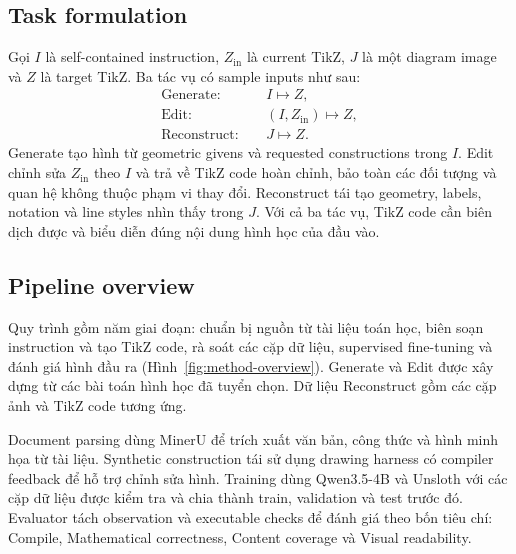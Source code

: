 \documentclass[a4paper,12pt]{article}
\begin{document}
\subsection{Task formulation}
\label{sec:tasks}
Gọi $I$ là self-contained instruction, $Z_{\mathrm{in}}$ là current TikZ, $J$ là một diagram image và $Z$ là target TikZ. Ba tác vụ có sample inputs như sau:
\begin{equation}
\begin{aligned}
\mathrm{Generate}:&\quad I\longmapsto Z,\\
\mathrm{Edit}:&\quad (I,Z_{\mathrm{in}})\longmapsto Z,\\
\mathrm{Reconstruct}:&\quad J\longmapsto Z.
\end{aligned}
\end{equation}
Generate tạo hình từ geometric givens và requested constructions trong $I$. Edit chỉnh sửa $Z_{\mathrm{in}}$ theo $I$ và trả về TikZ code hoàn chỉnh, bảo toàn các đối tượng và quan hệ không thuộc phạm vi thay đổi. Reconstruct tái tạo geometry, labels, notation và line styles nhìn thấy trong $J$. Với cả ba tác vụ, TikZ code cần biên dịch được và biểu diễn đúng nội dung hình học của đầu vào.

\subsection{Pipeline overview}
\label{sec:overview}
Quy trình gồm năm giai đoạn: chuẩn bị nguồn từ tài liệu toán học, biên soạn instruction và tạo TikZ code, rà soát các cặp dữ liệu, supervised fine-tuning và đánh giá hình đầu ra (Hình~\ref{fig:method-overview}). Generate và Edit được xây dựng từ các bài toán hình học đã tuyển chọn. Dữ liệu Reconstruct gồm các cặp ảnh và TikZ code tương ứng.

Document parsing dùng MinerU \cite{mineru} để trích xuất văn bản, công thức và hình minh họa từ tài liệu. Synthetic construction tái sử dụng drawing harness có compiler feedback để hỗ trợ chỉnh sửa hình. Training dùng Qwen3.5-4B và Unsloth \cite{qwen35,unsloth35} với các cặp dữ liệu được kiểm tra và chia thành train, validation và test trước đó. Evaluator tách observation và executable checks để đánh giá theo bốn tiêu chí: Compile, Mathematical correctness, Content coverage và Visual readability.
\end{document}
